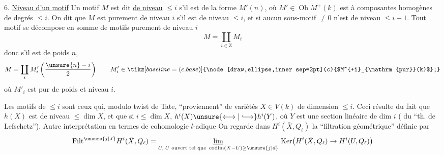 6. \uline{Niveau d'un motif}  Un motif $M$ est dit \uline{de niveau} $\leq i$ s'il est de la forme $M'(n)$, où $M'\in\operatorname{Ob}M^+(k)$ est à composantes homogènes de degrés $\leq i$.
On dit que $M$ est purement de niveau $i$ s'il est de niveau $\leq i$, et si aucun sous-motif $\ne0$ n'est de niveau $\leq i-1$.  Tout motif  se décompose  en somme de motifs purement de niveau $i$
\[
M=\coprod_{i\in\mathrm Z}M_i
\]
donc s'il est de  poids $n$,  
\[
M=\coprod_i M'_i\left(\frac{\unsure{n}-i}{2}\right)\qquad M'_i\in\mathord{\tikz[baseline=(c.base)]{\node[draw,ellipse,inner sep=2pt](c){$M^{+i}_{\mathrm{pur}}(k)$};}}
\]
où $M'_i$ est   pur de poids et niveau $i$.

 Les motifs de  $\leq i$ sont ceux qui, modulo twist de Tate, ``proviennent'' de variétés $X\in V(k)$ de dimension $\leq i$. Ceci résulte du fait que $h(X)$ est de niveau $\leq\dim X$, et que  si $i\leq\dim X$, $h^i(X)\unsure{\longleftrightarrow|\lhook\joinrel\longrightarrow}h^i(Y)$, où $Y$ est une section linéaire de dim $i$ ( du ``th. de Lefschetz'').
Autre interprétation en termes de cohomologie $l$-adique  On regarde dans $H^i(\bar X,Q_\ell)$ la ``filtration géométrique'' définie par
\[
\mathrm{Filt}^{\unsure{j|J}}H^i(\bar X,Q_\ell)=
\underset{U,\;U\text{ ouvert tel que }\operatorname{codim}(X-U)\geq \unsure{j|d}}{\underline{\lim}}\,
\operatorname{Ker}\bigl(H^i(\bar X,Q_\ell)\to H^i(U,Q_\ell)\bigr)
\]

